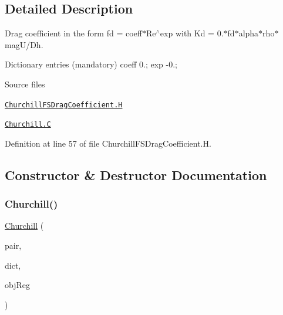 \subsection{Detailed Description}
Drag coefficient in the form fd = coeff$\ast$\+Re$^\wedge$exp with Kd = 0.$\ast$fd$\ast$alpha$\ast$rho$\ast$mag\+U/\+Dh. 

\label{_Description}%
 Dictionary entries (mandatory) coeff 0.; exp -\/0.;

\begin{DoxyParagraph}{Source files}

\begin{DoxyItemize}
\item \href{../../../home/carlo/data/GeN-Foam/GeN-Foam_ffn/GeN-Foam/GeN-Foam/classes/thermalHydraulics/src/physicsModels/dragModels/FSDragCoefficientModels/Churchill/ChurchillFSDragCoefficient.H}{\tt Churchill\+F\+S\+Drag\+Coefficient.\+H} 
\item \href{../../../home/carlo/data/GeN-Foam/GeN-Foam_ffn/GeN-Foam/GeN-Foam/classes/thermalHydraulics/src/physicsModels/dragModels/FSDragCoefficientModels/Churchill/Churchill.C}{\tt Churchill.\+C} 
\end{DoxyItemize}
\end{DoxyParagraph}


Definition at line 57 of file Churchill\+F\+S\+Drag\+Coefficient.\+H.



\subsection{Constructor \& Destructor Documentation}
\mbox{\label{classFoam_1_1FSDragCoefficientModels_1_1Churchill_aa413e80ec6afec14e2fc4e471aa977a1}} 
\subsubsection{\texorpdfstring{Churchill()}{Churchill()}}
{\footnotesize\ttfamily \hyperlink{classFoam_1_1FSDragCoefficientModels_1_1Churchill}{Churchill} (\begin{DoxyParamCaption}\item[{const \hyperlink{classFoam_1_1FSPair}{F\+S\+Pair} \&}]{pair,  }\item[{const dictionary \&}]{dict,  }\item[{const object\+Registry \&}]{obj\+Reg }\end{DoxyParamCaption})}



